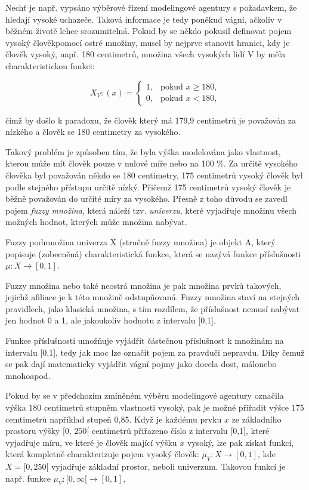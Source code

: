 Nech\v t je např. vypsáno výběrové řízení modelingové agentury s požadavkem, že hledají vysoké uchazeče. Taková informace je tedy poněkud vágní, ačkoliv v běžném životě lehce srozumitelná. Pokud by se někdo pokusil definovat pojem \clqq vysoký člověk\crqq \space pomocí ostré množiny, musel by nejprve stanovit hranici, kdy je člověk vysoký, např. 180 centimetr\r u, množina všech vysokých lidí V by měla charakteristickou funkci:

    $$X_V:(x)=\begin{cases} 1, & \mbox{pokud }  x \geq 180,\\    0, & \mbox{pokud } x < 180,  \end{cases}$$

    čímž by došlo k paradoxu, že člověk který má 179,9 centimetr\r u je považován za nízkého a člověk se 180 centimetry za vysokého.

    Takový problém je zp\r usoben tím, že byla výška modelována jako vlastnost, kterou m\r uže mít člověk pouze v nulové míře nebo na 100 \%. Za určitě vysokého člověka byl považován někdo se 180 centimetry, 175 centimetr\r u vysoký člověk byl podle stejného přístupu určitě n\'izk\'y. Přičemž 175 centimetr\r u vysoký člověk je běžně považován do určité míry za vysokého. Přesně z toho d\r uvodu se zavedl pojem \textit{fuzzy množina}, která náleží tzv. \textit{univerzu}, které vyjadřuje množinu všech možných hodnot, kterých může množina nabývat. 
    
    \begin{definition}
    \cite{navara}
        Fuzzy podmnožina univerza X (stručně fuzzy množina) je objekt A, který popisuje (zobecněná) charakteristická funkce, která se nazývá funkce příslušnosti $\mu: X \rightarrow [0,1]$. 
    \end{definition}
    
    Fuzzy množina nebo také neostrá množina je pak množina prvků takových, jejichž afiliace je k této množině odstupňovaná. Fuzzy množina staví na stejných pravidlech, jako klasická množina, s tím rozdílem, že příslušnost nemusí nabývat jen hodnot 0 a 1, ale jakoukoliv hodnotu z intervalu [0,1]. 
   
    Funkce příslušnosti umož\v nuje vyjádřit částečnou příslušnost k množinám na intervalu [0,1], tedy jak moc lze označit pojem za \clqq pravdu\crqq \space či \clqq nepravdu\crqq. Díky čemuž se pak dají matematicky vyjádřit vágní pojmy jako \clqq docela dost\crqq, \clqq málo\crqq \space nebo \clqq mnoho\crqq \space apod.

     Pokud by se v předchozím zmíněném výběru modelingové agentury označila výška 180 centimetr\r u stupněm vlastnosti \clqq vysoký\crqq {}, pak je možné přiřadit výšce 175 cemtimetr\r u například stupe\v n 0,85. Když je každému prvku $x$ ze základního prostoru výšky [0, $250$[ centimetr\r u přiřazeno číslo z intervalu [0,1], které vyjadřuje míru, ve které je člověk mající výšku $x$ vysoký, lze pak získat funkci, která kompletně charakterizuje pojem vysoký člověk: $\mu_V: X \to [0,1]$, kde $X = [0, 250[$ vyjadřuje základní prostor, neboli univerzum. Takovou funkcí je např. funkce $\mu_V:  [0, \infty[ \rightarrow [0,1]$, 

